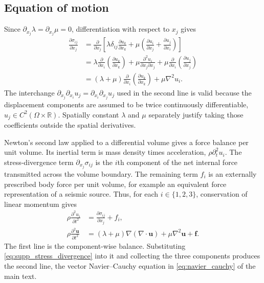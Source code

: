 \subsection*{Equation of motion}

Since $\partial_{x_j}\lambda = \partial_{x_j}\mu = 0$, differentiation with
respect to $x_j$ gives
\begin{equation}
  \begin{aligned}
    \frac{\partial\sigma_{ij}}{\partial x_j} & = \frac{\partial}{\partial x_j}
    \left[\lambda\delta_{ij}\frac{\partial u_k}{\partial x_k}
      + \mu\left(\frac{\partial u_i}{\partial x_j}
    + \frac{\partial u_j}{\partial x_i}\right)\right] \\
    & = \lambda\frac{\partial}{\partial x_i}
    \left(\frac{\partial u_k}{\partial x_k}\right)
    + \mu\frac{\partial^2u_i}{\partial x_j\partial x_j}
    + \mu\frac{\partial}{\partial x_i}
    \left(\frac{\partial u_j}{\partial x_j}\right) \\
    & = (\lambda + \mu)\frac{\partial}{\partial x_i}
    \left(\frac{\partial u_k}{\partial x_k}\right) + \mu\nabla^2u_i.
  \end{aligned}
  \label{eq:supp_stress_divergence}
\end{equation}
The interchange
$\partial_{x_j}\partial_{x_i}u_j = \partial_{x_i}\partial_{x_j}u_j$ used in
the second line is valid because the displacement components are assumed to be
twice continuously differentiable, $u_j\in C^2(\Omega \times \mathbb{R})$.
Spatially constant $\lambda$ and $\mu$ separately justify taking those
coefficients outside the spatial derivatives.

Newton's second law applied to a differential volume gives a force balance per
unit volume. Its inertial term is mass density times acceleration,
$\rho\partial_t^2u_i$. The stress-divergence term
$\partial_{x_j}\sigma_{ij}$ is the $i$th component of the net internal force
transmitted across the volume boundary. The remaining term $f_i$ is an
externally prescribed body force per unit volume, for example an equivalent
force representation of a seismic source. Thus, for each $i\in\{1,2,3\}$,
conservation of linear momentum gives
\begin{equation}
  \begin{aligned}
    \rho\frac{\partial^2u_i}{\partial t^2}
    & = \frac{\partial\sigma_{ij}}{\partial x_j} + f_i, \\
    \rho\frac{\partial^2\mathbf{u}}{\partial t^2}
    & = (\lambda + \mu)\nabla(\nabla \cdot \mathbf{u})
    + \mu\nabla^2\mathbf{u} + \mathbf{f}.
  \end{aligned}
  \label{eq:supp_navier_cauchy}
\end{equation}
The first line is the component-wise balance. Substituting
\cref{eq:supp_stress_divergence} into it and collecting the three
components produces the second line, the vector Navier--Cauchy equation in
\cref{eq:navier_cauchy} of the main text.

